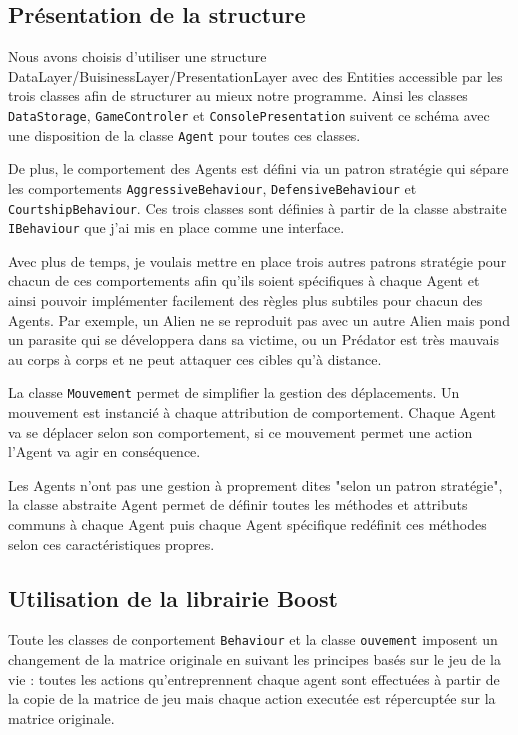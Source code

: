 \subsection{Présentation de la structure}
Nous avons choisis d'utiliser une structure DataLayer/BuisinessLayer/PresentationLayer avec des Entities accessible par les trois classes afin de structurer au mieux notre programme. Ainsi les classes \verb$DataStorage$, \verb$GameControler$ et \verb$ConsolePresentation$ suivent ce schéma avec une disposition de la classe \verb$Agent$ pour toutes ces classes.



De plus, le comportement des Agents est défini via un patron stratégie qui sépare les comportements \verb$AggressiveBehaviour$, \verb$DefensiveBehaviour$ et \verb$CourtshipBehaviour$. Ces trois classes sont définies à partir de la classe abstraite \verb$IBehaviour$ que j'ai mis en place comme une interface.

Avec plus de temps, je voulais mettre en place trois autres patrons stratégie pour chacun de ces comportements afin qu'ils soient spécifiques à chaque Agent et ainsi pouvoir implémenter facilement des règles plus subtiles pour chacun des Agents. Par exemple, un Alien ne se reproduit pas avec un autre Alien mais pond un parasite qui se développera dans sa victime, ou un Prédator est très mauvais au corps à corps et ne peut attaquer ces cibles qu'à distance.

La classe \verb$Mouvement$ permet de simplifier la gestion des déplacements. Un mouvement est instancié à chaque attribution de comportement. Chaque Agent va se déplacer selon son comportement, si ce mouvement permet une action l'Agent va agir en conséquence.

Les Agents n'ont pas une gestion à proprement dites "selon un patron stratégie", la classe abstraite Agent permet de définir toutes les méthodes et attributs communs à chaque Agent puis chaque Agent spécifique redéfinit ces méthodes selon ces caractéristiques propres.

\subsection{Utilisation de la librairie Boost}
Toute les classes de conportement \verb$Behaviour$ et la classe \verb$ouvement$ imposent un changement de la matrice originale en suivant les principes basés sur le jeu de la vie : toutes les actions qu'entreprennent chaque agent sont effectuées à partir de la copie de la matrice de jeu mais chaque action executée est répercuptée sur la matrice originale.

